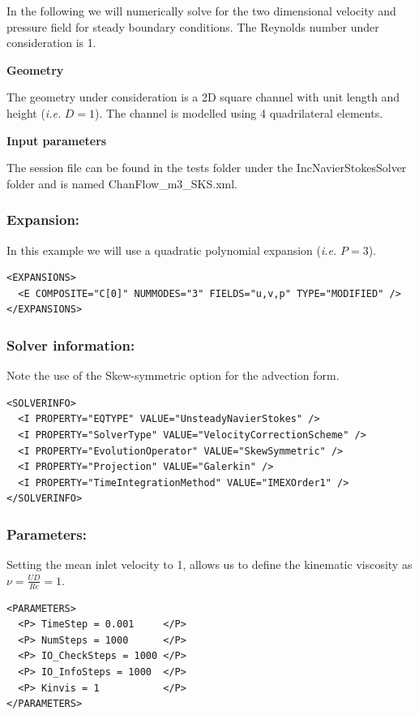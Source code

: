 In the following we will numerically solve for the two dimensional velocity and pressure field for steady boundary conditions. The Reynolds number under consideration is 1.

\textbf{Geometry}

The geometry under consideration is a 2D square channel with unit length and height (\textit{i.e.} $D=1$). The channel is modelled using 4 quadrilateral elements.

\textbf{Input parameters}

The session file can be found in the tests folder under the IncNavierStokesSolver folder and is named ChanFlow\_m3\_SKS.xml.

\subsubsection{Expansion:~} In this example we will use a quadratic polynomial expansion (\textit{i.e.} $P=3$).
\begin{lstlisting}[style=XMLStyle]
<EXPANSIONS>
  <E COMPOSITE="C[0]" NUMMODES="3" FIELDS="u,v,p" TYPE="MODIFIED" />
</EXPANSIONS>
\end{lstlisting}

\subsubsection{Solver information:~} Note the use of the Skew-symmetric option for the advection form.
\begin{lstlisting}[style=XMLStyle]
<SOLVERINFO>
  <I PROPERTY="EQTYPE" VALUE="UnsteadyNavierStokes" />
  <I PROPERTY="SolverType" VALUE="VelocityCorrectionScheme" />
  <I PROPERTY="EvolutionOperator" VALUE="SkewSymmetric" />
  <I PROPERTY="Projection" VALUE="Galerkin" />
  <I PROPERTY="TimeIntegrationMethod" VALUE="IMEXOrder1" />
</SOLVERINFO>
\end{lstlisting}

\subsubsection{Parameters:~} Setting the mean inlet velocity to 1, allows us to define the kinematic viscosity as $\nu = \frac{UD}{Re}=1$.
\begin{lstlisting}[style=XMLStyle]
<PARAMETERS>
  <P> TimeStep = 0.001     </P>
  <P> NumSteps = 1000      </P>
  <P> IO_CheckSteps = 1000 </P>
  <P> IO_InfoSteps = 1000  </P>
  <P> Kinvis = 1           </P>
</PARAMETERS>
\end{lstlisting}

